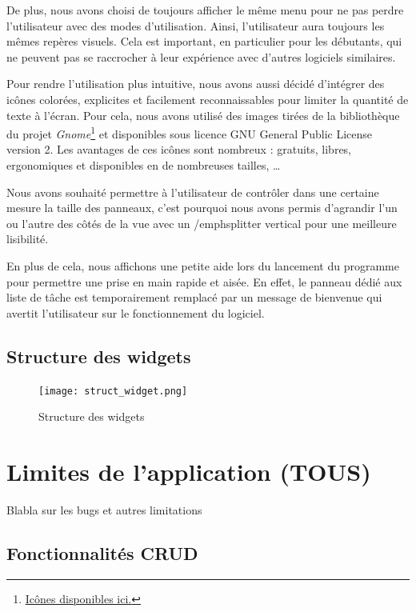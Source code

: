 		De plus, nous avons choisi de toujours afficher le même menu pour ne pas perdre l'utilisateur avec des \og modes \fg d'utilisation. Ainsi, l'utilisateur aura toujours les mêmes repères visuels. Cela est important, en particulier pour les débutants, qui ne peuvent pas se raccrocher à leur expérience avec d'autres logiciels similaires.\newline
		
		Pour rendre l'utilisation plus intuitive, nous avons aussi décidé d'intégrer des icônes colorées, explicites et facilement reconnaissables pour limiter la quantité de texte à l'écran. Pour cela, nous avons utilisé des images tirées de la bibliothèque du projet \emph{Gnome}\footnote{\href{https://commons.wikimedia.org/wiki/GNOME_Desktop_icons}{Icônes disponibles ici.}} et disponibles sous licence GNU General Public License version 2. Les avantages de ces icônes sont nombreux : gratuits, libres, ergonomiques et disponibles en de nombreuses tailles, \dots \newline
		
		Nous avons souhaité permettre à l'utilisateur de contrôler dans une certaine mesure la taille des panneaux, c'est pourquoi nous avons permis d'agrandir l'un ou l'autre des côtés de la vue avec un /emph{splitter} vertical pour une meilleure lisibilité.
		
		En plus de cela, nous affichons une petite aide lors du lancement du programme pour permettre une prise en main rapide et aisée. En effet, le panneau dédié aux liste de tâche est temporairement remplacé par un message de bienvenue qui avertit l'utilisateur sur le fonctionnement du logiciel.
		
		
	\section{Structure des widgets}
	
		\begin{figure}[h!]
		   \texttt{[image: struct\_widget.png]}
		   \caption{Structure des widgets}
		\end{figure}
		\FloatBarrier
		
		
		
	
\chapter{Limites de l'application (TOUS)}

	Blabla sur les bugs et autres limitations
	
	\section{Fonctionnalités CRUD}
	
